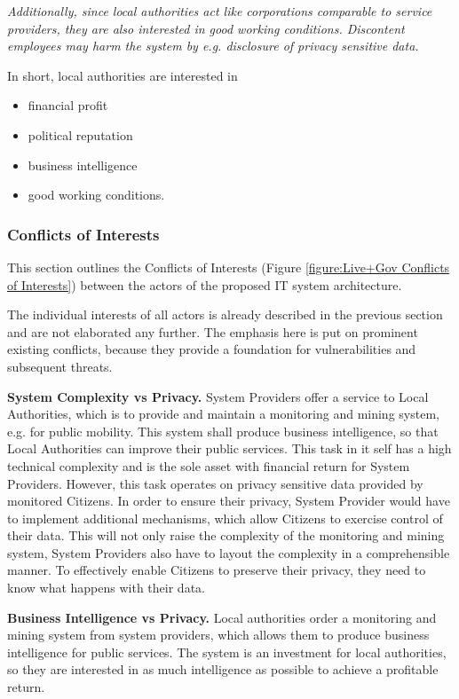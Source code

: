 \documentclass[runningheads,a4paper]{llncs}
\newenvironment{LGContent}
{ \par\color{blue} \it \small }
{ \par }
\begin{document}
\begin{LGContent}
Additionally, since local authorities act like corporations comparable to service providers, they are also interested in good working conditions.
Discontent employees may harm the system by e.g. disclosure of privacy sensitive data.

In short, local authorities are interested in
\begin{itemize}
\item financial profit
\item political reputation
\item business intelligence
\item good working conditions.
\end{itemize}


\subsubsection{Conflicts of Interests}
\label{subsubsection:Conflicts of Interests}
This section outlines the Conflicts of Interests (Figure \ref{figure:Live+Gov Conflicts of Interests}) between the actors of the proposed IT system architecture.

The individual interests of all actors is already described in the previous section and are not elaborated any further.
The emphasis here is put on prominent existing conflicts, because they provide a foundation for vulnerabilities and subsequent threats.



\textbf{System Complexity vs Privacy.}
System Providers offer a service to Local Authorities, which is to provide and maintain a monitoring and mining system, e.g. for public mobility.
This system shall produce business intelligence, so that Local Authorities can improve their public services.
This task in it self has a high technical complexity and is the sole asset with financial return for System Providers.
However, this task operates on privacy sensitive data provided by monitored Citizens.
In order to ensure their privacy, System Provider would have to implement additional mechanisms, which allow Citizens to exercise control of their data.
This will not only raise the complexity of the monitoring and mining system, System Providers also have to layout the complexity in a comprehensible manner.
To effectively enable Citizens to preserve their privacy, they need to know what happens with their data.

\textbf{Business Intelligence vs Privacy.}
Local authorities order a monitoring and mining system from system providers, which allows them to produce business intelligence for public services.
The system is an investment for local authorities, so they are interested in as much intelligence as possible to achieve a profitable return.


\end{LGContent}
\end{document}
